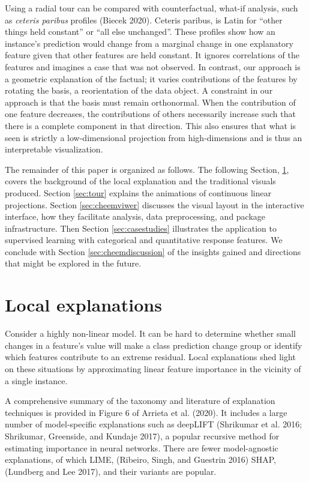 \documentclass[
]{article}
\begin{document}
Using a radial tour can be compared with counterfactual, what-if analysis, such as \emph{ceteris paribus} profiles (Biecek 2020). Ceteris paribus, is Latin for ``other things held constant'' or ``all else unchanged''. These profiles show how an instance's prediction would change from a marginal change in one explanatory feature given that other features are held constant. It ignores correlations of the features and imagines a case that was not observed. In contrast, our approach is a geometric explanation of the factual; it varies contributions of the features by rotating the basis, a reorientation of the data object. A constraint in our approach is that the basis must remain orthonormal. When the contribution of one feature decreases, the contributions of others necessarily increase such that there is a complete component in that direction. This also ensures that what is seen is strictly a low-dimensional projection from high-dimensions and is thus an interpretable visualization.

The remainder of this paper is organized as follows. The following Section, \ref{sec:explanations}, covers the background of the local explanation and the traditional visuals produced. Section \ref{sec:tour} explains the animations of continuous linear projections. Section \ref{sec:cheemviwer} discusses the visual layout in the interactive interface, how they facilitate analysis, data preprocessing, and package infrastructure. Then Section \ref{sec:casestudies} illustrates the application to supervised learning with categorical and quantitative response features. We conclude with Section \ref{sec:cheemdiscussion} of the insights gained and directions that might be explored in the future.

\hypertarget{sec:explanations}{%
\section{Local explanations}\label{sec:explanations}}

Consider a highly non-linear model. It can be hard to determine whether small changes in a feature's value will make a class prediction change group or identify which features contribute to an extreme residual. Local explanations shed light on these situations by approximating linear feature importance in the vicinity of a single instance.

A comprehensive summary of the taxonomy and literature of explanation techniques is provided in Figure 6 of Arrieta et al. (2020). It includes a large number of model-specific explanations such as deepLIFT (Shrikumar et al. 2016; Shrikumar, Greenside, and Kundaje 2017), a popular recursive method for estimating importance in neural networks. There are fewer model-agnostic explanations, of which LIME, (Ribeiro, Singh, and Guestrin 2016) SHAP, (Lundberg and Lee 2017), and their variants are popular.
\end{document}
